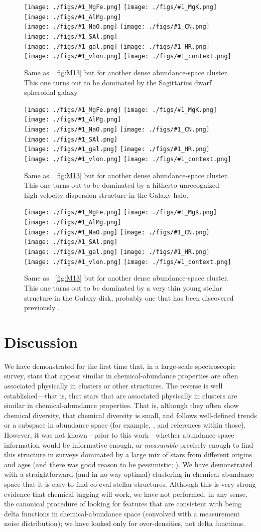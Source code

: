 \documentclass[12pt, letterpaper, preprint]{aastex}
\newcommand{\insanefigure}[1]{%
\texttt{[image: ./figs/\#1\_MgFe.png]}%
\texttt{[image: ./figs/\#1\_MgK.png]}%
\texttt{[image: ./figs/\#1\_AlMg.png]}\\
\texttt{[image: ./figs/\#1\_NaO.png]}%
\texttt{[image: ./figs/\#1\_CN.png]}%
\texttt{[image: ./figs/\#1\_SAl.png]}\\
\texttt{[image: ./figs/\#1\_gal.png]}%
\texttt{[image: ./figs/\#1\_HR.png]}\\
\texttt{[image: ./figs/\#1\_vlon.png]}%
\texttt{[image: ./figs/\#1\_context.png]}}
\begin{document}
\begin{figure}[!p]
\insanefigure{cluster_0256_0177}
\caption{Same as \figurename~\ref{fig:M13} but for another dense
  abundance-space cluster.
  This one turns out to be dominated by the Sagittarius dwarf spheroidal galaxy.\label{fig:Sgr}}
\end{figure}
\begin{figure}[!p]
\insanefigure{cluster_0256_0010}
\caption{Same as \figurename~\ref{fig:M13} but for another dense
  abundance-space cluster.
  This one turns out to be dominated by a hitherto unrecognized high-velocity-dispersion
  structure in the Galaxy halo.\label{fig:halo}}
\end{figure}
\begin{figure}[!p]
\insanefigure{cluster_0256_0141}
\caption{Same as \figurename~\ref{fig:M13} but for another dense
  abundance-space cluster.
  This one turns out to be dominated by a very thin young stellar
  structure in the Galaxy disk, probably one that has been discovered previously \citep{wegg}.\label{fig:disk}}
\end{figure}

\clearpage
\section{Discussion}\label{sec:discussion}

We have demonstrated for the first time that, in a large-scale
spectroscopic survey, stars that appear similar in
chemical-abundance properties are often associated physically in
clusters or other structures.
The reverse is well established---that is, that stars that are
associated physically in clusters are similar in chemical-abundance
properties.
That is, although they often show chemical diversity, that chemical
diversity is small, and follows well-defined trends or a subspace in
abundance space (for example, \citealt{gratton, meszaros, bovy},
and references within those).
However, it was not known---prior to this work---whether abundance-space information would be
informative enough, or \emph{measurable} precisely enough to find this
structure in surveys dominated by a large mix of stars from different
origins and ages (and there was good reason to be pessimistic;
\citealt{ting}).
We have demonstrated with a straightforward (and in no way optimal)
clustering in chemical-abundance space that it is easy to find co-eval
stellar structures.
Although this is very strong evidence that chemical tagging will work,
we have not performed, in any sense, the canonical procedure of
looking for features that are consistent with being delta functions in
chemical-abundance space (convolved with a measurement noise
distribution); we have looked only for over-densities, not delta
functions.
\end{document}
